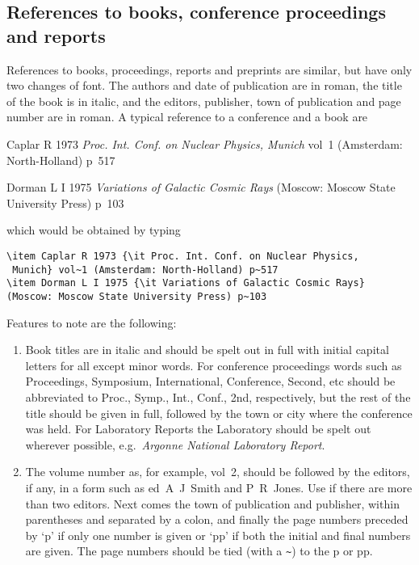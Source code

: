 \subsection{References to books, conference proceedings and reports}
References to books,
proceedings, reports and preprints are similar, but have
only two changes of font. The authors and date of publication are in
roman, the title of the book is in italic, and the editors, publisher,
town of publication and page number are in roman. A typical reference to a
conference and a book are
\begin{thereferences}
\item Caplar R 1973 {\it Proc. Int. Conf. on Nuclear Physics, 
 Munich} vol~1 (Amsterdam: North-Holland) p~517
\item Dorman L I 1975 {\it Variations of Galactic Cosmic Rays} 
(Moscow: Moscow State University Press) p~103
\end{thereferences}     
which would be obtained by typing
\begin{verbatim}
\item Caplar R 1973 {\it Proc. Int. Conf. on Nuclear Physics, 
 Munich} vol~1 (Amsterdam: North-Holland) p~517
\item Dorman L I 1975 {\it Variations of Galactic Cosmic Rays} 
(Moscow: Moscow State University Press) p~103
\end{verbatim}


Features to note are the following:
\begin{enumerate}
\item Book titles are in italic and should be spelt out in full with 
initial capital letters for all except minor words. For conference
proceedings words such as 
Proceedings, Symposium, International, Conference, Second, etc should 
be abbreviated to Proc., Symp., Int., Conf., 2nd, 
respectively, but the rest of the title should be given in full, 
followed by the town or city where the conference was held. For 
Laboratory Reports the Laboratory should be spelt out wherever 
possible, e.g.\ {\it Argonne National Laboratory Report}.

\item The volume number as, for example, vol~2, should be followed by 
the editors, if any, in a form such as ed~A~J~Smith and P~R~Jones. Use 
\etal if there are more than two editors. Next comes the town of 
publication and publisher, within parentheses and separated by a colon, 
and finally the page numbers preceded by `p' if only one number is given 
or `pp' if both the initial and final numbers are given. The page 
numbers should be tied (with a \verb"~") to the p or pp.
\end{enumerate}

